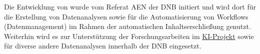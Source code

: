 \documentclass[a4paper,12pt,oneside]{scrreport}
\begin{document}
Die Entwicklung von  wurde vom Referat \ac{AEN} der
\ac{DNB} initiert und wird dort für die Erstellung von Datenanalysen
sowie für die Automatisierung von Workflows (Datenmanagement) im
Rahmen der automatischen Inhaltserschließung genutzt. Weiterhin wird
es zur Unterstützung der Forschungsarbeiten im
\href{https://www.dnb.de/ki-projekt}{KI-Projekt} sowie für diverse
andere Datenanalysen innerhalb der \ac{DNB} eingesetzt.



\end{document}
